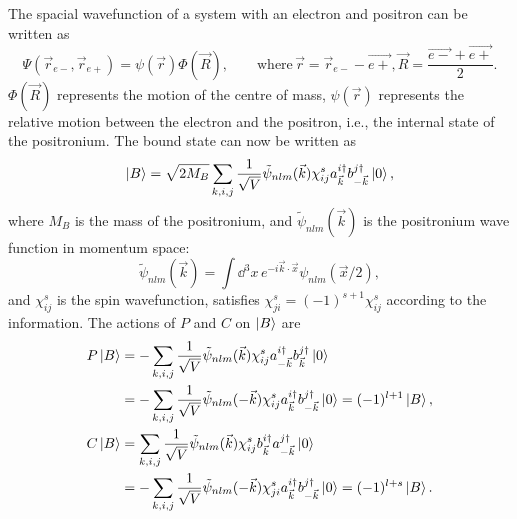 \solution
\begin{problembody}
    \item The spacial wavefunction of a system with an electron and positron can be written as
    \begin{equation*}
        \Psi(\vec{r}_{e-}, \vec{r}_{e+}) = \psi(\vec{r})\Phi(\vec{R}), 
        \qquad \text{where} \, \vec{r} = \vec{r}_{e-} - \vec{e+},
        \vec{R} = \frac{\vec{e-} + \vec{e+}}{2}.
    \end{equation*}
    $\Phi(\vec{R})$ represents the motion of the centre of mass, $\psi(\vec{r})$ represents the relative motion between
    the electron and the positron, i.e., the internal state of the positronium. The bound state can now be written as
    \begin{equation*}
        \left|B\right\rangle = \sqrt{2M_B}\sum_{k, i, j}\frac{1}{\sqrt{V}}
        \tilde{\psi}_{nlm}(\vec{k})\chi_{ij}^s 
        a_{\vec{k}}^{i\dagger} b_{-\vec{k}}^{j\dagger}
        \left|0\right\rangle,
    \end{equation*}
    where $M_B$ is the mass of the positronium, and $\tilde{\psi}_{nlm}(\vec{k})$ is the positronium wave function in momentum space:
    \begin{equation*}
        \tilde{\psi}_{nlm}(\vec{k}) = \int \dd^3x \, 
        e^{-i\vec{k}\cdot\vec{x}}
        \psi_{nlm}(\vec{x} / 2),
    \end{equation*}
    and $\chi_{ij}^s$ is the spin wavefunction, satisfies $\chi_{ji}^s = (-1)^{s + 1}\chi_{ij}^s$ according to the information.
    The actions of $P$ and $C$ on $\left|B\right\rangle$ are
    \begin{align*}
        P\left|B\right\rangle & = -\sum_{k, i, j}\frac{1}{\sqrt{V}}
        \tilde{\psi}_{nlm}(\vec{k})\chi_{ij}^s 
        a_{-\vec{k}}^{i\dagger} b_{\vec{k}}^{j\dagger}
        \left|0\right\rangle\\
        & = -\sum_{k, i, j}\frac{1}{\sqrt{V}}
        \tilde{\psi}_{nlm}(-\vec{k})\chi_{ij}^s 
        a_{\vec{k}}^{i\dagger} b_{-\vec{k}}^{j\dagger}
        \left|0\right\rangle = (-1)^{l + 1}\left|B\right\rangle,\\
        C\left|B\right\rangle & = \sum_{k, i, j}\frac{1}{\sqrt{V}}
        \tilde{\psi}_{nlm}(\vec{k})\chi_{ij}^s 
        b_{\vec{k}}^{i\dagger} a_{-\vec{k}}^{j\dagger}
        \left|0\right\rangle\\
        & = -\sum_{k, i, j}\frac{1}{\sqrt{V}}
        \tilde{\psi}_{nlm}(-\vec{k})\chi_{ji}^s 
        a_{\vec{k}}^{i\dagger} b_{-\vec{k}}^{j\dagger}
        \left|0\right\rangle = (-1)^{l + s}\left|B\right\rangle.
    \end{align*}


\end{problembody}

